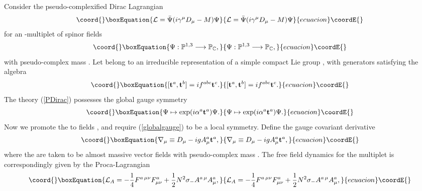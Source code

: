 \documentclass[a4paper,aps,prd,showkeys,showpacs,superscriptaddress,preprint]{revtex4}
\providecommand{\pc}{\mathbb{P}}
\begin{document}
Consider the pseudo-complexified Dirac Lagrangian
\begin{equation}\coord{}\boxEquation{\label{PDirac}
  \mathcal{L} = \bar\Psi(i \gamma^\mu D_\mu - M) \Psi
}{\mathcal{L} = \bar\Psi(i \gamma^\mu D_\mu - M) \Psi
}{ecuacion}\coordE{}\end{equation}
for an \coordHE{}-multiplet of spinor fields
\begin{equation}\coord{}\boxEquation{
  \Psi: \pc^{1,3} \longrightarrow \pc_\mathbb{C},
}{
  \Psi: \pc^{1,3} \longrightarrow \pc_\mathbb{C},
}{ecuacion}\coordE{}\end{equation}
with pseudo-complex mass \coordHE{}. Let \myHighlight{$\Psi$}\coordHE{} belong to an
irreducible representation of a simple compact Lie group \coordHE{}, with
generators \coordHE{} satisfying the algebra
\begin{equation}\coord{}\boxEquation{
  [\mathbf{t}^a,\mathbf{t}^b] = i f^{abc} \mathbf{t}^c.
}{
  [\mathbf{t}^a,\mathbf{t}^b] = i f^{abc} \mathbf{t}^c.
}{ecuacion}\coordE{}\end{equation}
The theory (\ref{PDirac}) possesses the global gauge symmetry
\begin{equation}\coord{}\boxEquation{\label{globalgauge}
  \Psi \mapsto \exp(i \mathbf{\alpha}^a \mathbf{t}^a) \Psi.
}{\Psi \mapsto \exp(i \mathbf{\alpha}^a \mathbf{t}^a) \Psi.
}{ecuacion}\coordE{}\end{equation}
Now we promote the \coordHE{} to fields \myHighlight{$\mathbf{\alpha}^a: \pc^{1,3} \longrightarrow \pc$}\coordHE{},
and require (\ref{globalgauge}) to be a local symmetry. Define the gauge covariant derivative
\begin{equation}\coord{}\boxEquation{
  \nabla_\mu \equiv D_\mu - i g A^a_\mu \mathbf{t}^a,
}{
  \nabla_\mu \equiv D_\mu - i g A^a_\mu \mathbf{t}^a,
}{ecuacion}\coordE{}\end{equation} 
where the \myHighlight{$A^a: \pc^{1,3} \longrightarrow \pc^{1,3}$}\coordHE{} are
taken to be almost massive
vector fields with pseudo-complex mass \myHighlight{$N \in \pc^0_-$}\coordHE{}. The free field
dynamics for the multiplet \coordHE{} is correspondingly given by the Proca-Lagrangian
\begin{equation}\coord{}\boxEquation{\label{freeA}
  \mathcal{L}_A = - \frac{1}{4} F^{a\,\mu\nu}
  F^a_{\mu\nu} + \frac{1}{2}
  N^2 \sigma_- A^{a\,\mu} A^a_\mu,
}{\mathcal{L}_A = - \frac{1}{4} F^{a\,\mu\nu}
  F^a_{\mu\nu} + \frac{1}{2}
  N^2 \sigma_- A^{a\,\mu} A^a_\mu,
}{ecuacion}\coordE{}\end{equation} 
\end{document}
